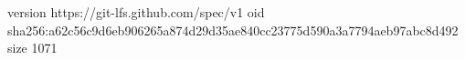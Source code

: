 version https://git-lfs.github.com/spec/v1
oid sha256:a62c56c9d6eb906265a874d29d35ae840cc23775d590a3a7794aeb97abc8d492
size 1071
